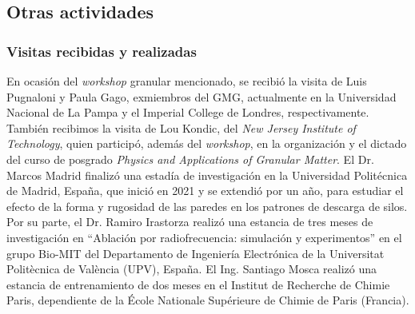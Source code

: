 \documentclass[a4paper,11pt,twoside,final,titlepage,onecolumn,openright]{report}
\begin{document}
\subsection{Otras actividades}

\subsubsection{Visitas recibidas y realizadas}

En ocasión del \textit{workshop} granular mencionado, se recibió la visita de Luis Pugnaloni y Paula Gago, exmiembros del GMG, actualmente en la Universidad Nacional de La Pampa y el Imperial College de Londres, respectivamente. También recibimos la visita de Lou Kondic, del \textit{New Jersey Institute of Technology}, quien participó, además del \textit{workshop}, en la organización y el dictado del curso de posgrado \textit{Physics and Applications of Granular Matter}. El Dr. Marcos Madrid finalizó una estadía de investigación en la Universidad Politécnica de Madrid, España, que inició en 2021 y se extendió por un año, para estudiar el efecto de la forma y rugosidad de las paredes en los patrones de descarga de silos. Por su parte, el Dr. Ramiro Irastorza realizó una estancia de tres meses de investigación en ``Ablación por radiofrecuencia: simulación y experimentos'' en el grupo Bio-MIT del Departamento de Ingeniería Electrónica de la Universitat Politècnica de València (UPV), España. El Ing. Santiago Mosca realizó una estancia de entrenamiento de dos meses en el Institut de Recherche de Chimie Paris, dependiente de la École Nationale Supérieure de Chimie de Paris (Francia).


% 
% 
% 
%  
\end{document}
